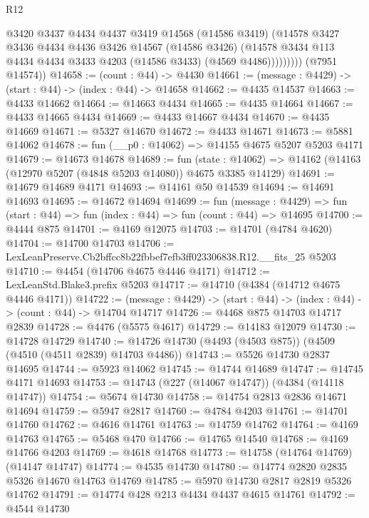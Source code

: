 \begin{lexlean}{R12}
\begin{coremodule}
                  @3420
                  @3437
                  @4434
                  @4437
                  @3419
                  @14568
                  (@14586 @3419)
                  (@14578
                    @3427
                    @3436
                    @4434
                    @4436
                    @3426
                    @14567
                    (@14586 @3426)
                    (@14578 @3434 @113 @4434 @4434 @3433 @4203 (@14586 @3433) (@4569 @4486)))))))))
      (@7951 @14574))
@14658 := (count : @44) -> @4430
@14661 := (message : @4429) -> (start : @44) -> (index : @44) -> @14658
@14662 := @4435 @14537
@14663 := @4433 @14662
@14664 := @14663 @4434
@14665 := @4435 @14664
@14667 := @4433 @14665 @4434
@14669 := @4433 @14667 @4434
@14670 := @4435 @14669
@14671 := @5327 @14670
@14672 := @4433 @14671
@14673 := @5881 @14062
@14678 := fun (__p0 : @14062) => @14155 @4675 @5207 @5203 @4171
@14679 := @14673 @14678
@14689 := fun (state : @14062) =>
  @14162 (@14163 (@12970 @5207 (@4848 @5203 @14080)) @4675 @3385 @14129)
@14691 := @14679 @14689 @4171
@14693 := @14161 @50 @14539
@14694 := @14691 @14693
@14695 := @14672 @14694
@14699 := fun (message : @4429) =>
  fun (start : @44) => fun (index : @44) => fun (count : @44) => @14695
@14700 := @4444 @875
@14701 := @4169 @12075
@14703 := @14701 (@4784 @4620)
@14704 := @14700 @14703
@14706 := LexLeanPreserve.Cb2bffcc8b22fbbef7efb3ff023306838.R12.__fits_25 @5203
@14710 := @4454 (@14706 @4675 @4446 @4171)
@14712 := LexLeanStd.Blake3.prefix @5203
@14717 := @14710 (@4384 (@14712 @4675 @4446 @4171))
@14722 := (message : @4429) -> (start : @44) -> (index : @44) -> (count : @44) -> @14704 @14717
@14726 := @4468 @875 @14703 @14717 @2839
@14728 := @4476 (@5575 @4617)
@14729 := @14183 @12079
@14730 := @14728 @14729
@14740 := @14726 @14730 (@4493 (@4503 @875)) (@4509 (@4510 (@4511 @2839) @14703 @4486))
@14743 := @5526 @14730 @2837 @14695
@14744 := @5923 @14062
@14745 := @14744 @14689
@14747 := @14745 @4171 @14693
@14753 := @14743 (@227 (@14067 @14747)) (@4384 (@14118 @14747))
@14754 := @5674 @14730
@14758 := @14754 @2813 @2836 @14671 @14694
@14759 := @5947 @2817
@14760 := @4784 @4203
@14761 := @14701 @14760
@14762 := @4616 @14761
@14763 := @14759 @14762
@14764 := @4169 @14763
@14765 := @5468 @470
@14766 := @14765 @14540
@14768 := @4169 @14766 @4203
@14769 := @4618 @14768
@14773 := @14758 (@14764 @14769) (@14147 @14747)
@14774 := @4535 @14730
@14780 := @14774 @2820 @2835 @5326 @14670 @14763 @14769
@14785 := @5970 @14730 @2817 @2819 @5326 @14762
@14791 := @14774 @428 @213 @4434 @4437 @4615 @14761
@14792 := @4544 @14730

\end{coremodule}
\end{lexlean}
